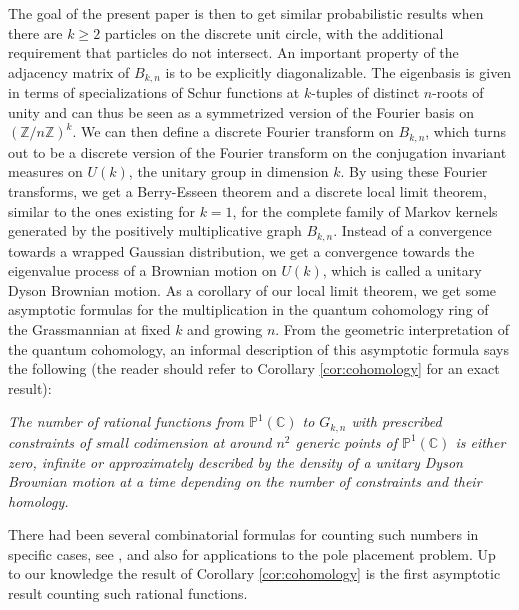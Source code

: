 \documentclass[10pt,11pt]{amsart}%
\begin{document}
The goal of the present paper is then to get similar probabilistic results when there are $k\geq 2$ particles on the discrete unit circle, with the additional requirement that particles do not intersect. An important property of the adjacency matrix of $B_{k,n}$ is to be explicitly diagonalizable. The eigenbasis is given in terms of specializations of Schur functions at $k$-tuples of distinct $n$-roots of unity and can thus be seen as a symmetrized version of the Fourier basis on $(\mathbb{Z}/n\mathbb{Z})^k$. We can then define a discrete Fourier transform on $B_{k,n}$, which turns out to be a discrete version of the Fourier transform on the conjugation invariant measures on $U(k)$, the unitary group in dimension $k$. By using these Fourier transforms, we get a Berry-Esseen theorem and a discrete local limit theorem, similar to the ones existing for $k=1$, for the complete family of Markov kernels generated by the positively multiplicative graph $B_{k,n}$. Instead of a convergence towards a wrapped Gaussian distribution, we get a convergence towards the eigenvalue process of a Brownian motion on $U(k)$, which is called a unitary Dyson Brownian motion. As a corollary of our local limit theorem, we get some asymptotic formulas for the multiplication in the quantum cohomology ring of the Grassmannian at fixed $k$ and growing $n$. From the geometric interpretation of the quantum cohomology, an informal description of this asymptotic formula says the following (the reader should refer to Corollary \ref{cor:cohomology} for an exact result):

\vspace{0.3cm}

 \textit{ The number of rational functions from $\mathbb{P}^1(\mathbb{C})$ to $G_{k,n}$ with prescribed constraints of small codimension at around $n^2$ generic points of $\mathbb{P}^1(\mathbb{C})$ is either zero, infinite or approximately described by the density of a unitary Dyson Brownian motion at a time depending on the number of constraints and their homology.}

\vspace{0.3cm}
There had been several combinatorial formulas for counting such numbers in specific cases, see \cite{RRW}, \cite{Sch} and also \cite{Sot} for applications to the pole placement problem. Up to our knowledge the result of Corollary \ref{cor:cohomology} is the first asymptotic result counting such rational functions.
\end{document}
